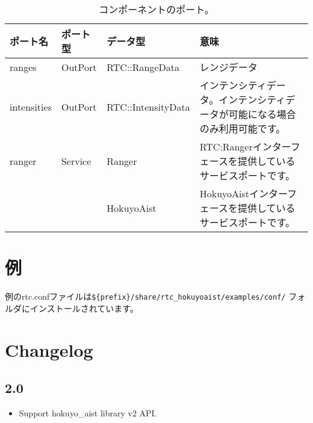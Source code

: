 \documentclass[a4paper,10pt]{article}
\newenvironment{Japanese}{%
  \CJKfamily{min}%
  \CJKtilde
  \CJKnospace}{}
\begin{document}
\begin{CJK}{UTF8}{}
\begin{Japanese}
\begin{table}[t]
  \centering
  \begin{tabularx}{\columnwidth}{lllX}
    \toprule
    ポート名 & ポート型 & データ型 & 意味 \\
    \midrule
    ranges & OutPort & RTC::RangeData & レンジデータ \\
    intensities & OutPort & RTC::IntensityData & インテンシティデータ。インテンシティデータが可能になる場合のみ利用可能です。 \\
    ranger & Service & Ranger & RTC:Rangerインターフェースを提供しているサービスポートです。 \\
    & & HokuyoAist & HokuyoAistインターフェースを提供しているサービスポートです。 \\
    \bottomrule
  \end{tabularx}
  \caption{コンポーネントのポート。}
  \label{tab:ports}
\end{table}

\section{例}
\label{sec:examples}

例のrtc.confファイルは\verb|${prefix}/share/rtc_hokuyoaist/examples/conf/|
フォルダにインストールされています。

\section{Changelog}

\subsection{2.0}

\begin{itemize}
  \item Support hokuyo\_aist library v2 API.
\end{itemize}

\end{Japanese}
\end{CJK}
\end{document}
